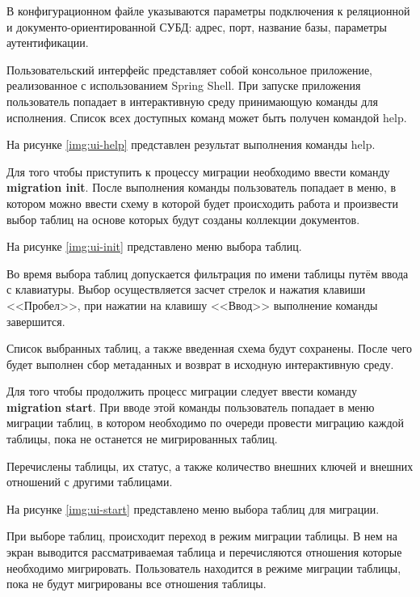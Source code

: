 В конфигурационном файле указываются параметры подключения к реляционной и документо-ориентированной СУБД:
адрес, порт, название базы, параметры аутентификации.

Пользовательский интерфейс представляет собой консольное приложение, реализованное с использованием Spring Shell.
При запуске приложения пользователь попадает в интерактивную среду принимающую команды для исполнения.
Список всех доступных команд может быть получен командой \textmd{help}.

На рисунке \ref{img:ui-help} представлен результат выполнения команды \textmd{help}.

Для того чтобы приступить к процессу миграции необходимо ввести команду \textbf{migration init}. 
После выполнения команды пользователь попадает в меню, 
в котором можно ввести схему в которой будет происходить работа
и произвести выбор таблиц на основе которых будут созданы коллекции документов.

\clearpage

На рисунке \ref{img:ui-init} представлено меню выбора таблиц.

Во время выбора таблиц допускается фильтрация по имени таблицы путём ввода с клавиатуры.
Выбор осуществляется засчет стрелок и нажатия клавиши <<Пробел>>, 
при нажатии на клавишу <<Ввод>> выполнение команды завершится.

Список выбранных таблиц, а также введенная схема будут сохранены.
После чего будет выполнен сбор метаданных и возврат в исходную интерактивную среду.

Для того чтобы продолжить процесс миграции следует ввести команду \textbf{migration start}.
При вводе этой команды пользователь попадает в меню миграции таблиц, 
в котором необходимо по очереди провести миграцию каждой таблицы, 
пока не останется не мигрированных таблиц.

Перечислены таблицы, их статус, а также количество внешних ключей и внешних отношений с другими таблицами.

На рисунке \ref{img:ui-start} представлено меню выбора таблиц для миграции.

\clearpage

При выборе таблиц, происходит переход в режим миграции таблицы.
В нем на экран выводится рассматриваемая таблица и перечисляются отношения которые необходимо мигрировать.
Пользователь находится в режиме миграции таблицы, пока не будут мигрированы все отношения таблицы.

